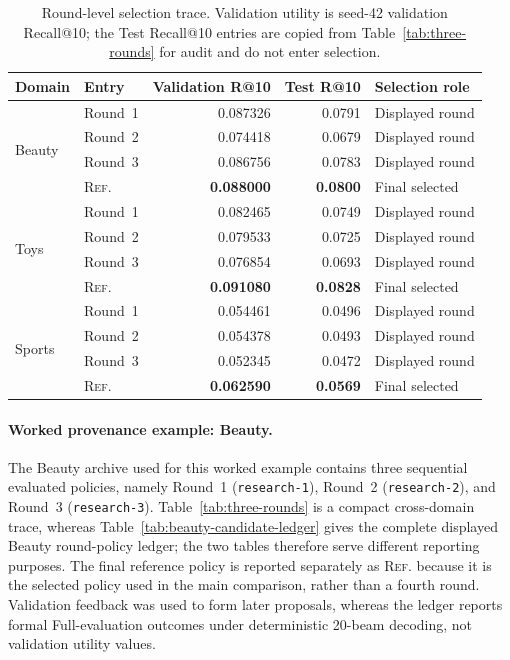 \begin{table}[H]
\centering
\caption{Round-level selection trace. Validation utility is seed-42 validation Recall@10; the Test Recall@10 entries are copied from Table~\ref{tab:three-rounds} for audit and do not enter selection.}
\label{tab:round-selection-trace}
\small
\renewcommand{\arraystretch}{1.05}
\setlength{\tabcolsep}{4.5pt}
\begin{tabular}{llrrl}
\hline
Domain & Entry & Validation R@10 & Test R@10 & Selection role \\
\hline
\multirow[c]{4}{*}{Beauty}
 & Round~1 & 0.087326 & 0.0791 & Displayed round \\
 & Round~2 & 0.074418 & 0.0679 & Displayed round \\
 & Round~3 & 0.086756 & 0.0783 & Displayed round \\
 & \textsc{Ref.} & \textbf{0.088000} & \textbf{0.0800} & Final selected \\
\hline
\multirow[c]{4}{*}{Toys}
 & Round~1 & 0.082465 & 0.0749 & Displayed round \\
 & Round~2 & 0.079533 & 0.0725 & Displayed round \\
 & Round~3 & 0.076854 & 0.0693 & Displayed round \\
 & \textsc{Ref.} & \textbf{0.091080} & \textbf{0.0828} & Final selected \\
\hline
\multirow[c]{4}{*}{Sports}
 & Round~1 & 0.054461 & 0.0496 & Displayed round \\
 & Round~2 & 0.054378 & 0.0493 & Displayed round \\
 & Round~3 & 0.052345 & 0.0472 & Displayed round \\
 & \textsc{Ref.} & \textbf{0.062590} & \textbf{0.0569} & Final selected \\
\hline
\end{tabular}
\end{table}

\paragraph{Worked provenance example: Beauty.}
The Beauty archive used for this worked example contains three sequential evaluated policies, namely Round~1 (\texttt{research-1}), Round~2 (\texttt{research-2}), and Round~3 (\texttt{research-3}). Table~\ref{tab:three-rounds} is a compact cross-domain trace, whereas Table~\ref{tab:beauty-candidate-ledger} gives the complete displayed Beauty round-policy ledger; the two tables therefore serve different reporting purposes. The final reference policy is reported separately as \textsc{Ref.} because it is the selected policy used in the main comparison, rather than a fourth round. Validation feedback was used to form later proposals, whereas the ledger reports formal Full-evaluation outcomes under deterministic 20-beam decoding, not validation utility values.

